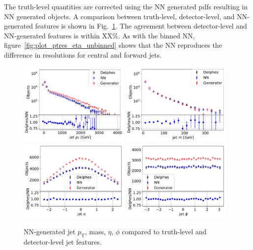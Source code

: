 \documentclass[showpacs,showkeys,preprint,prd,nofootinbib,linenumbers,12pt]{revtex4-1}
\def\pt{\ensuremath{p_{\mathrm{T}}}}
\begin{document}
The truth-level quantities are corrected using the NN generated pdfs resulting in NN generated objects. A comparison between truth-level, detector-level, and NN-generated features is shown in Fig.~\ref{fig:nnVsDelphes}. The agreement between detector-level and NN-generated features is within XX\%. As with the binned NN, figure~\ref{fig:plot_ptres_eta_unbinned} shows that the NN reproduces the difference in resolutions for central and forward jets. 

\begin{figure}[htb]
  \includegraphics[width=0.48\textwidth]{jet_pT_genVsReco_origScale_test_log.pdf}
  \includegraphics[width=0.48\textwidth]{jet_m_genVsReco_origScale_test_log.pdf}\\
  \includegraphics[width=0.48\textwidth]{jet_eta_genVsReco_origScale_test.pdf}
  \includegraphics[width=0.48\textwidth]{jet_phi_genVsReco_origScale_test.pdf}
  \caption{NN-generated jet \pt, mass, $\eta$, $\phi$ compared to truth-level and detector-level jet features. }
  \label{fig:nnVsDelphes}
\end{figure}
\end{document}
